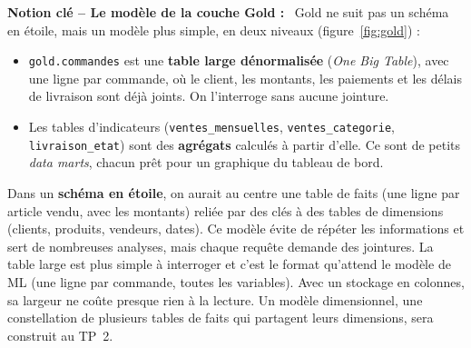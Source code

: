 \documentclass[11pt,a4paper]{article}
\newcommand{\cmd}[1]{\texttt{#1}}
\newenvironment{notion}[1][]{\par\medskip\noindent\textbf{\textcolor{lhblue}{Notion clé\if\relax\detokenize{#1}\relax\else{} -- #1\fi{} :}}\ }{\par\medskip}
\begin{document}
\begin{notion}[Le modèle de la couche Gold]
Gold ne suit pas un schéma en étoile, mais un modèle plus
simple, en deux niveaux (figure~\ref{fig:gold}) :
\begin{itemize}[leftmargin=*,itemsep=1pt,topsep=2pt]
\item \cmd{gold.commandes} est une \textbf{table large dénormalisée} (\emph{One Big Table}), avec une
  ligne par commande, où le client, les montants, les paiements et les délais de livraison sont
  déjà joints. On l'interroge sans aucune jointure.
\item Les tables d'indicateurs (\cmd{ventes\_mensuelles}, \cmd{ventes\_categorie},
  \cmd{livraison\_etat}) sont des \textbf{agrégats} calculés à partir d'elle. Ce sont de petits
  \emph{data marts}, chacun prêt pour un graphique du tableau de bord.
\end{itemize}
Dans un \textbf{schéma en étoile}, on aurait au centre une table de faits (une ligne par article
vendu, avec les montants) reliée par des clés à des tables de dimensions (clients, produits,
vendeurs, dates). Ce modèle évite de répéter les informations et sert de nombreuses analyses, mais
chaque requête demande des jointures. La table large est plus simple à interroger et c'est le
format qu'attend le modèle de ML (une ligne par commande, toutes les variables). Avec un stockage
en colonnes, sa largeur ne coûte presque rien à la lecture. Un modèle dimensionnel, une constellation
de plusieurs tables de faits qui partagent leurs dimensions, sera construit au TP~2.
\end{notion}
\end{document}
